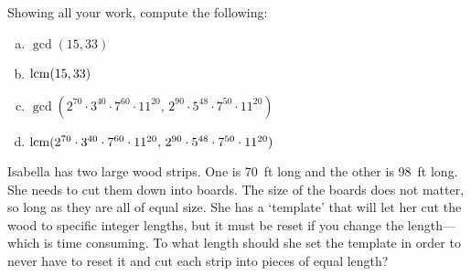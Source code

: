 \documentclass[11pt,letterpaper]{article}
\begin{document}
\newpage



 Showing all your work, compute the following:
	\begin{enumerate}[(a)]
	\item $\gcd(15, 33)$
	\item $\operatorname{lcm}(15, 33)$
	\item $\gcd(2^{70} \cdot 3^{40} \cdot 7^{60} \cdot 11^{20},\, 2^{90} \cdot 5^{48} \cdot 7^{50} \cdot 11^{20})$
	\item $\operatorname{lcm}(2^{70} \cdot 3^{40} \cdot 7^{60} \cdot 11^{20},\, 2^{90} \cdot 5^{48} \cdot 7^{50} \cdot 11^{20})$
	\end{enumerate} 



\newpage



 Isabella has two large wood strips. One is 70~ft long and the other is 98~ft long. She needs to cut them down into boards. The size of the boards does not matter, so long as they are all of equal size. She has a `template' that will let her cut the wood to specific integer lengths, but it must be reset if you change the length---which is time consuming. To what length should she set the template in order to never have to reset it and cut each strip into pieces of equal length? 
\end{document}
